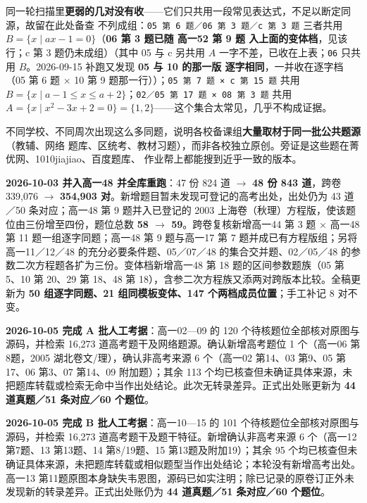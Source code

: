 \documentclass[a4paper,11pt]{article}
\begin{document}
同一轮扫描里\textbf{更弱的几对没有收}------它们只共用一段常见表达式，不足以断定同源，故留在此处备查
不列成组：\texttt{05\ 第\ 6\ 题／06\ 第\ 3\ 题／c\ 第\ 3\ 题} 三者共用 \(B=\{x\mid ax-1=0\}\)（\textbf{06 第 3 题已随 高一52 第 9 题 入上面的变体档}，见该行；c 第 3 题仍未成组）（其中 05 与 c
另共用 \(A\) 一字不差，已收在上表；\texttt{06} 只共用 \(B\)。2026-09-15 补跑又发现 \textbf{05 与 10 的那一版
逐字相同}，一并收在逐字档（05 第 6 题 $\times$ 10 第 9 题那一行））；\texttt{05\ 第\ 7\ 题\ ×\ c\ 第\ 15\ 题} 共用
\(B=\{x\mid a-1\leqslant x\leqslant a+2\}\)；\texttt{02／05\ 第\ 17\ 题\ ×\ 08\ 第\ 3\ 题} 共用
\(A=\{x\mid x^2-3x+2=0\}=\{1,2\}\)------这个集合太常见，几乎不构成证据。

不同学校、不同周次出现这么多同题，说明各校备课组\textbf{大量取材于同一批公共题源}（教辅、网络
题库、区统考、教材习题），而非各校独立原创。旁证是这些题在菁优网、1010jiajiao、百度题库、
作业帮上都能搜到近乎一致的版本。

\textbf{2026-10-03 并入高一48 并全库重跑}：47 份 824 道 $\to$ \textbf{48 份 843 道}，跨卷 339,076 $\to$ \textbf{354,903 对}。新增题目暂未发现可登记的高考出处，出处仍为 43 道／50 条对应；高一48 第 9 题并入已登记的 2003 上海卷（秋理）方程版，使该题位由三份增至四份，题位总数 \textbf{58 $\to$ 59}。跨卷复核新增高一44 第 3 题 $\times$ 高一48 第 11 题一组逐字同题；高一48 第 9 题与高一17 第 7 题并成已有方程版组；另将 高一11／12／48 的充分必要条件题、05／07／48 的集合交并题、02／05／48 的参数二次方程题各扩为三份。变体档新增高一48 第 18 题的区间参数题族（05 第 5、10 第 20、29 第 18、48 第 18），含参二次方程族又添两对跨版本比较。全稿更新为 \textbf{50 组逐字同题、21 组同模板变体、147 个两档成员位置}；手工补记 8 对不变。

\textbf{2026-10-05 完成 A 批人工考据}：高一02---09 的 120 个待核题位全部核对原图与源码，并检索 16,273 道高考题干及网络题源。确认新增高考题位 1 个（高一06 第8题，2005 湖北卷文/理），确认非高考来源 6 个（高一02 第14、03 第9、05 第17、06 第3、07 第14、09 附加题）；其余 113 个均已核查但未确证具体来源，未把题库转载或检索无命中当作出处结论。此次无转录差异。正式出处账更新为 \textbf{44 道真题／51 条对应／60 个题位}。

\textbf{2026-10-05 完成 B 批人工考据}：高一10---15 的 101 个待核题位全部核对原图与源码，并检索 16,273 道高考题干及题干特征。新增确认非高考来源 6 个（高一12 第7题、13 第13题、14 第8/19题、15 第13题及附加19）；其余 95 个均已核查但未确证具体来源，未把题库转载或相似题型当作出处结论；本轮没有新增高考出处。高一13 第11题原图本身缺失韦恩图，源码已如实注明；除已记录的原卷订正外未发现新的转录差异。正式出处账仍为 \textbf{44 道真题／51 条对应／60 个题位}。
\end{document}
